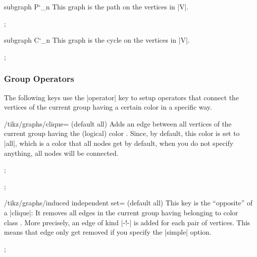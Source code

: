 \begin{graph}{subgraph P\char`\_n}
  This graph is the path on the vertices in |V|.
\begin{codeexample}[]
\tikz {};    
\end{codeexample}
\end{graph}


\begin{graph}{subgraph C\char`\_n}
  This graph is the cycle on the vertices in |V|.
\begin{codeexample}[]
\tikz {};    
\end{codeexample}
\end{graph}



\subsubsection{Group Operators}

The following keys use the |operator| key to setup operators that
connect the vertices of the current group having a certain color in a
specific way.

\begin{key}{/tikz/graphs/clique= (default all)}
  Adds an edge between all vertices of the current group having the
  (logical) color . Since, by default, this color is set
  to |all|, which is a color that all nodes get by default, when you
  do not specify anything, all nodes will be connected.
\begin{codeexample}[]
\tikz {};    
\end{codeexample}
\begin{codeexample}[]
\tikz {};    
\end{codeexample}
\end{key}

\begin{key}{/tikz/graphs/induced independent set= (default all)}
  This key is the ``opposite'' of a |clique|: It removes all edges in
  the current group having belonging to color class . More
  precisely, an edge of kind |-!-| is added for each pair of
  vertices. This means that edge only get removed if you specify the
  |simple| option.
\begin{codeexample}[]
\tikz {};    
\end{codeexample}
\end{key}


